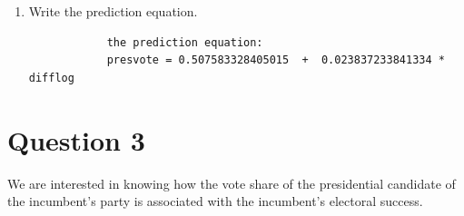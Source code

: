 \documentclass[12pt,letterpaper]{article}
\begin{document}
\begin{enumerate}
\begin{enumerate}
		\end{enumerate}
		\vspace{1cm}
		\item Write the prediction equation.
		
		\begin{verbatim}
			the prediction equation:
			presvote = 0.507583328405015  +  0.023837233841334 * difflog
		\end{verbatim}
	\end{enumerate}
	
	\newpage	
\section*{Question 3}

\noindent We are interested in knowing how the vote share of the presidential candidate of the incumbent's party is associated with the incumbent's electoral success.
	\vspace{.25cm}
\end{document}
